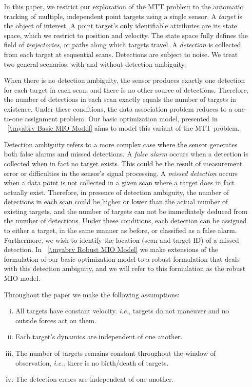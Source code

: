 In this paper, we restrict our exploration of the MTT problem to the automatic tracking of multiple, independent point targets using a single sensor. A \textit{target} is the object of interest. A point target's only identifiable attributes are its state space, which we restrict to position and velocity. The state space fully defines the field of \textit{trajectories}, or paths along which targets travel. A \textit{detection} is collected from each target at sequential scans. Detections are subject to noise. We treat two general scenarios: with and without detection ambiguity. 

When there is no detection ambiguity, the sensor produces exactly one detection for each target in each scan, and there is no other source of detections. Therefore, the number of detections in each scan exactly equals the number of targets in existence. Under these conditions, the data association problem reduces to a one-to-one assignment problem. Our basic optimization model, presented in \mysection~\ref{\myabrv Basic MIO Model} aims to model this variant of the MTT problem.

Detection ambiguity refers to a more complex case where the sensor generates both false alarms and missed detections. A \textit{false alarm} occurs when a detection is collected when in fact no target exists. This could be the result of measurement error or difficulties in the sensor's signal processing. A \textit{missed detection} occurs when a data point is not collected in a given scan where a target does in fact actually exist. Therefore, in presence of detection ambiguity, the number of detections in each scan could be higher or lower than the actual number of existing targets, and the number of targets can not be immediately deduced from the number of detections. Under these conditions, each detection can be assigned to either a target, in the same manner as before, or classified as a false alarm. Furthermore, we wish to identify the location (scan and target ID) of a missed detection. In \mysection~\ref{\myabrv Robust MIO Model} we make extensions of the formulation of our basic optimization model to a robust formulation that deals with this detection ambiguity, and we will refer to this formulation as the robust MIO model.

Throughout the paper we make the following assumptions:
\begin{assumption}\label{ass:general_assumption}
\leavevmode
\begin{enumerate}[(i)]
\item All targets have constant velocity. \textit{i.e.}, targets do not maneuver and no outside forces act on them.
\item Each target's dynamics are independent of one another.
\item The number of targets remains constant throughout the window of observation, \textit{i.e.}, there is no birth/death of targets.
\item The detection errors are independent of one another.
\end{enumerate}
\end{assumption}

